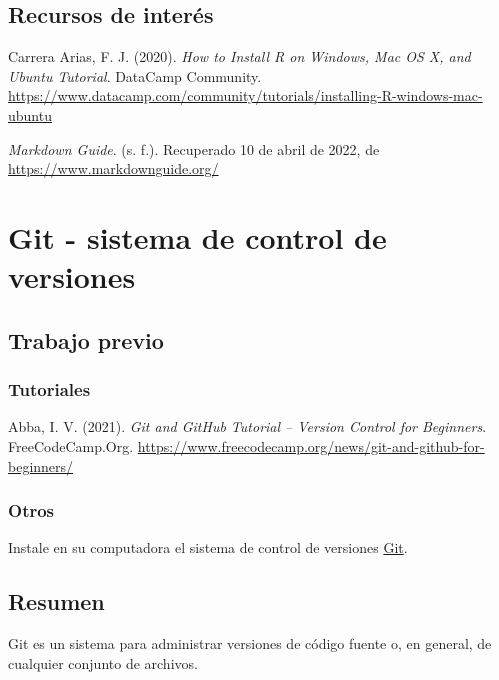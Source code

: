 \documentclass[
  letterpaper,
  DIV=11,
  numbers=noendperiod]{scrreprt}
\begin{document}
\hypertarget{recursos-de-interuxe9s}{%
\section{Recursos de interés}\label{recursos-de-interuxe9s}}

Carrera Arias, F. J. (2020). \emph{How to Install R on Windows, Mac OS
X, and Ubuntu Tutorial}. DataCamp Community.
\url{https://www.datacamp.com/community/tutorials/installing-R-windows-mac-ubuntu}

\emph{Markdown Guide}. (s. f.). Recuperado 10 de abril de 2022, de
\url{https://www.markdownguide.org/}

\hypertarget{git---sistema-de-control-de-versiones}{%
\chapter{Git - sistema de control de
versiones}\label{git---sistema-de-control-de-versiones}}

\hypertarget{trabajo-previo-2}{%
\section{Trabajo previo}\label{trabajo-previo-2}}

\hypertarget{tutoriales-1}{%
\subsection{Tutoriales}\label{tutoriales-1}}

Abba, I. V. (2021). \emph{Git and GitHub Tutorial -- Version Control for
Beginners}. FreeCodeCamp.Org.
\url{https://www.freecodecamp.org/news/git-and-github-for-beginners/}

\hypertarget{otros-1}{%
\subsection{Otros}\label{otros-1}}

Instale en su computadora el sistema de control de versiones
\href{https://git-scm.com/downloads}{Git}.

\hypertarget{resumen-1}{%
\section{Resumen}\label{resumen-1}}

Git es un sistema para administrar versiones de código fuente o, en
general, de cualquier conjunto de archivos.
\end{document}
